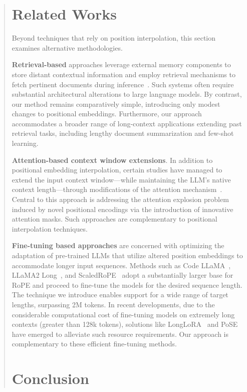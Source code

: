 \begin{abstract}
\section{Related Works}

Beyond techniques that rely on position interpolation, this section examines alternative methodologies.

\textbf{Retrieval-based} approaches leverage external memory components to store distant contextual information and employ retrieval mechanisms to fetch pertinent documents during inference~\cite{longllama,wang2023augmenting,borgeaud2022improving}. Such systems often require substantial architectural alterations to large language models. By contrast, our method remains comparatively simple, introducing only modest changes to positional embeddings. Furthermore, our approach accommodates a broader range of long-context applications extending past retrieval tasks, including lengthy document summarization and few-shot learning.

\textbf{Attention-based context window extensions}. In addition to positional embedding interpolation, certain studies have managed to extend the input context window—while maintaining the LLM’s native context length—through modifications of the attention mechanism~\cite{han2023lminfinite, streamingllm,parallelwindow}. Central to this approach is addressing the attention explosion problem induced by novel positional encodings via the introduction of innovative attention masks. Such approaches are complementary to positional interpolation techniques.

\textbf{Fine-tuning based approaches} are concerned with optimizing the adaptation of pre-trained LLMs that utilize altered position embeddings to accommodate longer input sequences. Methods such as Code LLaMA~\cite{codellama}, LLaMA2 Long~\cite{xiong2023effective}, and ScaledRoPE~\cite{liu2023scaling} adopt a substantially larger base for RoPE and proceed to fine-tune the models for the desired sequence length. The technique we introduce enables support for a wide range of target lengths, surpassing 2M tokens. In recent developments, due to the considerable computational cost of fine-tuning models on extremely long contexts (greater than 128k tokens), solutions like LongLoRA~\cite{longlora} and PoSE~\cite{zhu2023pose} have emerged to alleviate such resource requirements. Our approach is complementary to these efficient fine-tuning methods.

\section{Conclusion}


\end{abstract}
